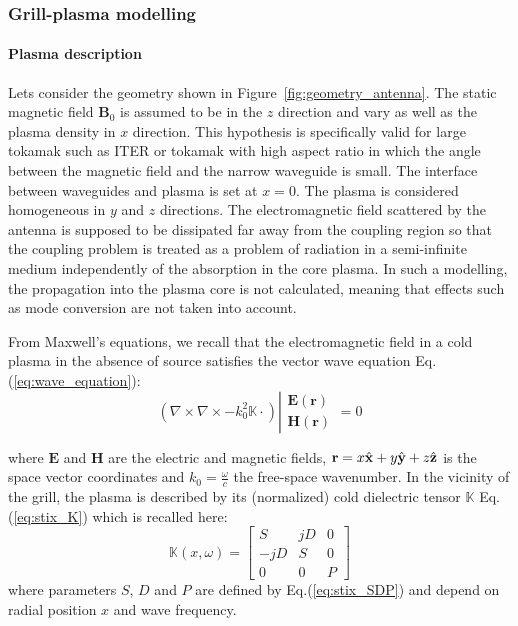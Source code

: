 \subsubsection{Grill-plasma modelling}\label{sec:grill_modeling}

\paragraph{Plasma description}\label{sec:dielectric_tensor}

Lets consider the geometry shown in Figure~\ref{fig:geometry_antenna}. The static magnetic field $\mathbf{B}_{0}$ is assumed to be in the $z$ direction and vary as well as the plasma density in $x$ direction. This hypothesis is specifically valid for large tokamak such as ITER or tokamak with high aspect ratio in which the angle between the magnetic field and the narrow waveguide is small. The interface between waveguides and plasma is set at $x=0$. The plasma is considered homogeneous
in $y$ and $z$ directions. The electromagnetic field scattered by the antenna is supposed to be dissipated far away from the coupling region so that the coupling problem is treated as a problem of radiation in a semi-infinite medium independently of the absorption in the core plasma. In such a modelling, the propagation into the plasma core is not calculated, meaning that effects such as mode conversion are not taken into account. 

From Maxwell's equations, we recall that the electromagnetic field in a cold plasma in the absence of source satisfies the vector wave equation Eq.(\ref{eq:wave_equation}):
\begin{equation}
\left(\nabla\times\nabla\times-k_{0}^{2}\mathbb{K}\cdot\right)\left|\begin{array}{c}
\mathbf{E}(\mathbf{r})\\
\mathbf{H}(\mathbf{r})\end{array}\right.=0
\end{equation}

where $\mathbf{E}$ and $\mathbf{H}$ are the electric and magnetic fields, $\mathbf{r}=x\mbox{\ensuremath{\hat{\mathbf{x}}}}+y\hat{\mathbf{y}}+z\hat{\mathbf{z}}$ is the space vector coordinates and $k_{0}=\frac{\omega}{c}$ the free-space wavenumber. In the vicinity of the grill, the plasma is described by its (normalized) cold dielectric tensor $\mathbb{K}$ Eq.(\ref{eq:stix_K}) which is recalled here: 
\begin{equation}
	\mathbb{K}(x,\omega)=\left[\begin{array}{ccc}
	S & jD & 0\\
	-jD & S & 0\\
	0 & 0 & P\end{array}\right]
	\label{eq:dielectric_tensor}
\end{equation}
where parameters $S$, $D$ and $P$ are defined by Eq.(\ref{eq:stix_SDP}) and depend on radial position $x$ and wave frequency.


